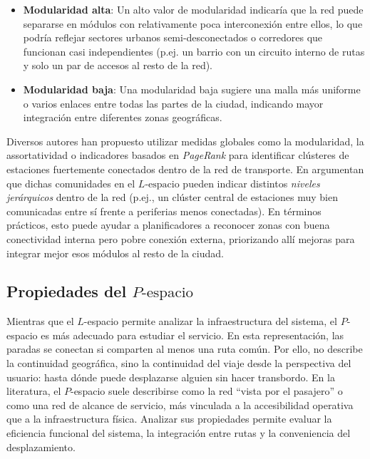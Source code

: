             \begin{itemize}
                \item \textbf{Modularidad alta}: Un alto valor de modularidad indicaría que la red puede separarse en módulos con relativamente poca interconexión entre ellos, lo que podría reflejar sectores urbanos semi-desconectados o corredores que funcionan casi independientes (p.ej. un barrio con un circuito interno de rutas y solo un par de accesos al resto de la red).

                \item \textbf{Modularidad baja}: Una modularidad baja sugiere una malla más uniforme o varios enlaces entre todas las partes de la ciudad, indicando mayor integración entre diferentes zonas geográficas.
            \end{itemize}

            Diversos autores han propuesto utilizar medidas globales como la modularidad, la assortatividad o indicadores basados en \textit{PageRank} para identificar clústeres de estaciones fuertemente conectados dentro de la red de transporte. En \cite{wang2023} argumentan que dichas comunidades en el $L\text{-espacio}$ pueden indicar distintos \textit{niveles jerárquicos} dentro de la red (p.ej., un clúster central de estaciones muy bien comunicadas entre sí frente a periferias menos conectadas). En términos prácticos, esto puede ayudar a planificadores a reconocer zonas con buena conectividad interna pero pobre conexión externa, priorizando allí mejoras para integrar mejor esos módulos al resto de la ciudad.

        \subsection{Propiedades del $P\text{-espacio}$}
            Mientras que el $L$-espacio permite analizar la infraestructura del sistema, el $P$-espacio es más adecuado para estudiar el servicio. En esta representación, las paradas se conectan si comparten al menos una ruta común. Por ello, no describe la continuidad geográfica, sino la continuidad del viaje desde la perspectiva del usuario: hasta dónde puede desplazarse alguien sin hacer transbordo. En la literatura, el $P$-espacio suele describirse como la red ``vista por el pasajero'' o como una red de alcance de servicio, más vinculada a la accesibilidad operativa que a la infraestructura física. Analizar sus propiedades permite evaluar la eficiencia funcional del sistema, la integración entre rutas y la conveniencia del desplazamiento.

